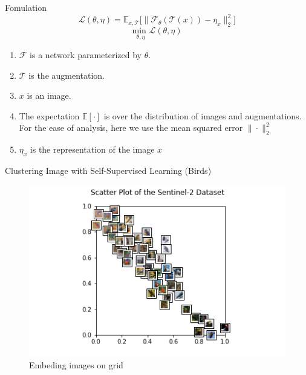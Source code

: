 \documentclass{beamer}
\begin{document}
	
	\begin{frame}[t]{Fomulation}
		$$\mathcal{L}(\theta, \eta) = \mathbb{E}_{x, \mathcal{T}}\Big[\|\mathcal{F}_\theta(\mathcal{T}(x)) - \eta_x\|_2^2\Big]$$
		$$\underset{\theta, \eta}{\text{min }} \mathcal{L}(\theta, \eta)$$
		\begin{enumerate}
			\item $\mathcal{F}$ is a network parameterized by $\theta$.
			\item $\mathcal{T}$ is the augmentation.
			\item $x$ is an image.
			\item The expectation $\mathbb{E}[\cdot]$ is over the distribution
			of images and augmentations. For the ease of analysis, here
			we use the mean squared error $\|\cdot\|^2_2$
			\item $\eta_x$ is the representation of the image $x$
			
		\end{enumerate}
	\end{frame}
	
	\begin{frame}[t]{Clustering Image with Self-Supervised Learning (Birds)}
		\begin{figure}
			\centering
			\includegraphics[scale=0.7]{birds.png}
			\caption{Embeding images on grid}
		\end{figure}
	\end{frame}
\end{document}
